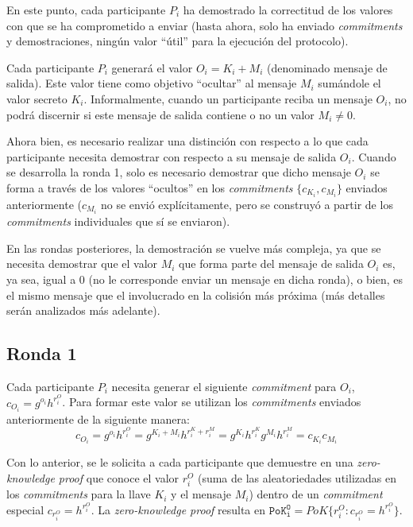 En este punto, cada participante $P_i$ ha demostrado la correctitud de los valores 
con que se ha comprometido a enviar (hasta ahora, solo ha enviado \emph{commitments} 
y demostraciones, ningún valor ``útil'' para la ejecución del protocolo).

Cada participante $P_i$ generará el valor $O_i = K_i + M_i$ (denominado mensaje de salida). 
Este valor tiene como objetivo ``ocultar'' al mensaje $M_i$ sumándole el valor 
secreto $K_i$. Informalmente, cuando un participante reciba un mensaje $O_i$, no podrá 
discernir si este mensaje de salida contiene o no un valor $M_i \neq 0$.

Ahora bien, es necesario realizar una distinción con respecto a lo que cada participante 
necesita demostrar con respecto a su mensaje de salida $O_i$. Cuando se desarrolla la 
ronda 1, solo es necesario demostrar que dicho mensaje $O_i$ se forma a través de los 
valores ``ocultos'' en los \emph{commitments} $\{c_{K_i}, c_{M_i}\}$ enviados anteriormente 
($c_{M_i}$ no se envió explícitamente, pero se construyó a partir de los \emph{commitments} 
individuales que sí se enviaron).

En las rondas posteriores, la demostración se vuelve más compleja, ya que se necesita 
demostrar que el valor $M_i$ que forma parte del mensaje de salida $O_i$ es, ya sea, igual 
a 0 (no le corresponde enviar un mensaje en dicha ronda), o bien, es el mismo mensaje que 
el involucrado en la colisión más próxima (más detalles serán analizados más adelante).

\subsection{Ronda 1}

Cada participante $P_i$ necesita generar el siguiente \emph{commitment} para 
$O_i$, $c_{O_i} = g^{o_i} h^{r_i^O}$. Para formar este valor se utilizan los \emph{commitments} 
enviados anteriormente de la siguiente manera: 
$$c_{O_i} = g^{o_i} h^{r_i^O} = g^{K_i + M_i} h^{r_i^K + r_i^M} = g^{K_i} h^{r_i^K} g^{M_i} h^{r_i^M} = c_{K_i} c_{M_i}$$

Con lo anterior, se le solicita a cada participante que demuestre en una \emph{zero-knowledge proof} 
que conoce el valor $r_i^O$ (suma de las aleatoriedades utilizadas en los 
\emph{commitments} para la llave $K_i$ y el mensaje $M_i$) dentro de un \emph{commitment} 
especial $c_{r_i^O} = h^{r_i^O}$. La \emph{zero-knowledge proof} resulta en 
$\mathtt{PoK_i^O} = PoK\{r_i^O : c_{r_i^O} = h^{r_i^O}\}$.

